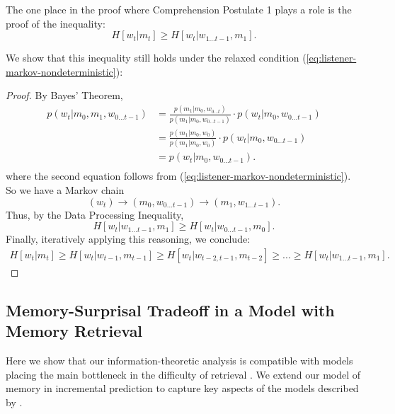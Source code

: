 \documentclass[11pt,letterpaper]{article}
\begin{document}
The one place in the proof where Comprehension Postulate 1 plays a role is the proof of the inequality:
\begin{equation}
	H[w_t | m_t] \geq H[w_t|w_{1 \dots t-1}, m_1].
\end{equation}

We show that this inequality still holds under the relaxed condition (\ref{eq:listener-markov-nondeterministic}):
\begin{proof}
	By Bayes' Theorem,
\begin{align*}
	p(w_t|m_0, m_1, w_{0\dots t-1}) &= \frac{p(m_1|m_0, w_{0\dots t})}{p(m_1|m_0, w_{0\dots t-1})} \cdot p(w_t|m_0, w_{0\dots t-1}) \\
 &= \frac{p(m_1|m_0, w_{0})}{p(m_1|m_0, w_{0})} \cdot p(w_t|m_0, w_{0\dots t-1}) \\
 &= p(w_t|m_0, w_{0\dots t-1}). \\
\end{align*}
	where the second equation follows from (\ref{eq:listener-markov-nondeterministic}).
So we have a Markov chain
\begin{equation}
(w_t) \rightarrow (m_0, w_{0 \dots t-1})   \rightarrow   (m_1, w_{1 \dots t-1}).
\end{equation}
Thus, by the Data Processing Inequality,
\begin{equation}
H[w_t| w_{1 \dots t-1}, m_{1}] \geq H[w_t|w_{0 \dots t-1}, m_0].
\end{equation}
Finally, iteratively applying this reasoning, we conclude:
\begin{align*}
H[w_t | m_t] \geq H[w_t| w_{t-1}, m_{t-1}] \geq H[w_t| w_{t-2, t-1}, m_{t-2}] \geq ... \geq H[w_t|w_{1 \dots t-1}, m_1].
\end{align*}
\end{proof}



\subsection{Memory-Surprisal Tradeoff in a Model with Memory Retrieval}

Here we show that our information-theoretic analysis is compatible with models placing the main bottleneck in the difficulty of retrieval \citep{mcelree2000sentence,lewis-activation-based-2005,nicenboim2018models,vasishth2019computational}.
We extend our model of memory in incremental prediction to capture key aspects of the models described by \citet{lewis-activation-based-2005,nicenboim2018models,vasishth2019computational}.
\end{document}

